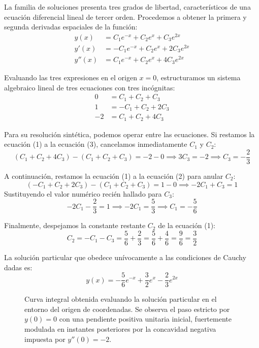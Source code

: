 \begin{tcolorbox}
La familia de soluciones presenta tres grados de libertad, característicos de una ecuación diferencial lineal de tercer orden. Procedemos a obtener la primera y segunda derivadas espaciales de la función:
\begin{align*}
    y(x)   &= C_1 e^{-x} + C_2 e^x + C_3 e^{2x} \\
    y'(x)  &= -C_1 e^{-x} + C_2 e^x + 2C_3 e^{2x} \\
    y''(x) &= C_1 e^{-x} + C_2 e^x + 4C_3 e^{2x}
\end{align*}

Evaluando las tres expresiones en el origen $x=0$, estructuramos un sistema algebraico lineal de tres ecuaciones con tres incógnitas:
\begin{align*}
    0  &= C_1 + C_2 + C_3 \\
    1  &= -C_1 + C_2 + 2C_3 \\
    -2 &= C_1 + C_2 + 4C_3 
\end{align*}

Para su resolución sintética, podemos operar entre las ecuaciones. Si restamos la ecuación (1) a la ecuación (3), cancelamos inmediatamente $C_1$ y $C_2$:
$$ (C_1 + C_2 + 4C_3) - (C_1 + C_2 + C_3) = -2 - 0 \implies 3C_3 = -2 \implies C_3 = -\frac{2}{3} $$

A continuación, restamos la ecuación (1) a la ecuación (2) para anular $C_2$:
$$ (-C_1 + C_2 + 2C_3) - (C_1 + C_2 + C_3) = 1 - 0 \implies -2C_1 + C_3 = 1 $$
Sustituyendo el valor numérico recién hallado para $C_3$:
$$ -2C_1 - \frac{2}{3} = 1 \implies -2C_1 = \frac{5}{3} \implies C_1 = -\frac{5}{6} $$

Finalmente, despejamos la constante restante $C_2$ de la ecuación (1):
$$ C_2 = -C_1 - C_3 = \frac{5}{6} + \frac{2}{3} = \frac{5}{6} + \frac{4}{6} = \frac{9}{6} = \frac{3}{2} $$

La solución particular que obedece unívocamente a las condiciones de Cauchy dadas es:
$$ y(x) = -\frac{5}{6}e^{-x} + \frac{3}{2}e^x - \frac{2}{3}e^{2x} $$

\begin{figure}[H]
    \centering
    
    \caption{Curva integral obtenida evaluando la solución particular en el entorno del origen de coordenadas. Se observa el paso estricto por $y(0)=0$ con una pendiente positiva unitaria inicial, fuertemente modulada en instantes posteriores por la concavidad negativa impuesta por $y''(0)=-2$.}
\end{figure}
\end{tcolorbox}

